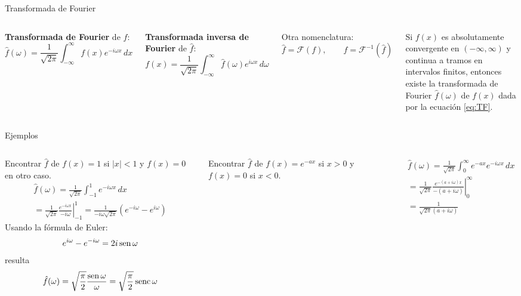 \documentclass[9pt, aspectratio=169]{beamer}
\begin{document}
\begin{frame}{Transformada de Fourier}
\begin{columns}[c]
\textbf{Transformada de Fourier} de $f$:
\begin{equation}\label{eq:TF}
    \hat{f}(\omega) = \frac{1}{\sqrt{2 \pi}} \int_{-\infty}^{\infty} f(x) e^{-i \omega x} \, dx
\end{equation}

\textbf{Transformada inversa de Fourier} de $\hat{f}$:
\begin{equation}\label{eq:TIF}
f(x) = \frac{1}{\sqrt{2 \pi}} \int_{-\infty}^{\infty} \hat{f}(\omega) e^{i \omega x} \, d\omega
\end{equation}

Otra nomenclatura:
\[ \hat{f} = \mathscr{F}(f), \qquad f = \mathscr{F}^{-1}(\hat{f}) \]

\begin{theorem}
    Si $f(x)$ es absolutamente convergente en $(-\infty, \infty)$ y continua a tramos en intervalos finitos, entonces existe la transformada de Fourier $\hat{f}(\omega)$ de $f(x)$ dada por la ecuación \eqref{eq:TF}.
\end{theorem}
\end{columns}
\end{frame}

\begin{frame}{Ejemplos}
\begin{columns}[t]
\cx
Encontrar $\hat{f}$ de $f(x) = 1$ si $|x| < 1$ y $f(x) = 0$ en otro caso.
\begin{multline*}
    \hat{f}(\omega) = \frac{1}{\sqrt{2 \pi}} \int_{-1}^{1} e^{-i \omega x} \, dx \\
    = \frac{1}{\sqrt{2 \pi}} \left. \frac{e^{-i \omega x}}{-i \omega} \right|_{-1}^{1} = \frac{1}{-i \omega \sqrt{2 \pi} } \left( e^{-i \omega} - e^{i \omega} \right)
\end{multline*}
Usando la fórmula de Euler:
\[ e^{i \omega}- e^{-i \omega} = 2 i \operatorname{sen} \omega \]
resulta
\[ \hat{f}(\omega) = \sqrt{\frac{\pi}{2}} \frac{\operatorname{sen} \omega}{\omega} = \sqrt{\frac{\pi}{2}} \operatorname{senc}{\omega} \]
\pause

\cx
Encontrar $\hat{f}$ de $f(x) = e^{-a x}$ si $x > 0$ y $f(x) = 0$ si $x < 0$.

\begin{multline*}
    \hat{f}(\omega) = \frac{1}{\sqrt{2 \pi}} \int_{0}^{\infty} e^{-a x} e^{-i \omega x} \, dx \\
    = \frac{1}{\sqrt{2 \pi}} \left. \frac{e^{-(a + i \omega) x}}{-(a + i \omega)} \right|_{0}^{\infty}  \\ 
        = \frac{1}{\sqrt{2 \pi} (a + i \omega) } 
\end{multline*}
\end{columns}
\end{frame}
\end{document}
